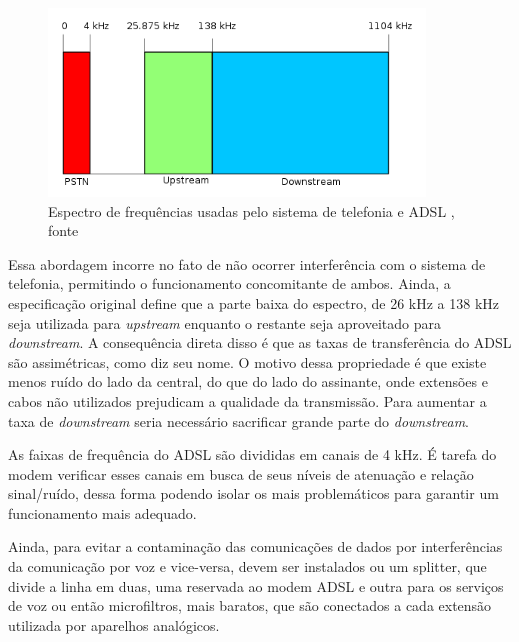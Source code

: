 \documentclass[brazil,times,12pt]{abnt}
\begin{document}
\begin{figure}[htp]
\begin{center}
  \includegraphics[width=100mm]{imagens/500px-ADSL_frequency_plan.png}
  \caption[Espectro de frequências usadas pelo sistema de
  telefonia e ADSL, fonte \cite{enwiki:adsl}]{Espectro de frequências usadas pelo
  sistema de telefonia e ADSL , fonte \cite{enwiki:adsl}}
  \label{espectro-adsl}
\end{center}
\end{figure}

Essa abordagem incorre no fato de não ocorrer interferência
com o sistema de telefonia, permitindo o funcionamento concomitante de ambos.
Ainda, a especificação original define que a parte baixa do espectro, de 26 kHz
a 138 kHz seja utilizada para \emph{upstream} enquanto o restante seja
aproveitado para \emph{downstream}. A consequência direta disso é que as taxas
de transferência do ADSL são assimétricas, como diz seu nome. O motivo
dessa propriedade é que existe menos ruído do lado da central, do que do lado
do assinante, onde extensões e cabos não utilizados prejudicam a qualidade da
transmissão. Para aumentar a taxa de \emph{downstream} seria necessário
sacrificar grande parte do \emph{downstream}. \cite{morimoto:opcoes-acesso}

As faixas de frequência do ADSL são divididas em canais de 4 kHz. É tarefa do
modem verificar esses canais em busca de seus níveis de atenuação e relação
sinal/ruído, dessa forma podendo isolar os mais problemáticos para garantir um
funcionamento mais adequado. \cite{hsw:dsl}

Ainda, para evitar a contaminação das comunicações de dados por
interferências da comunicação por voz e vice-versa, devem ser instalados
ou um splitter, que divide a linha em duas, uma reservada ao modem ADSL e outra
para os serviços de voz ou então microfiltros, mais baratos, que são conectados
a cada extensão utilizada por aparelhos analógicos.
\end{document}
